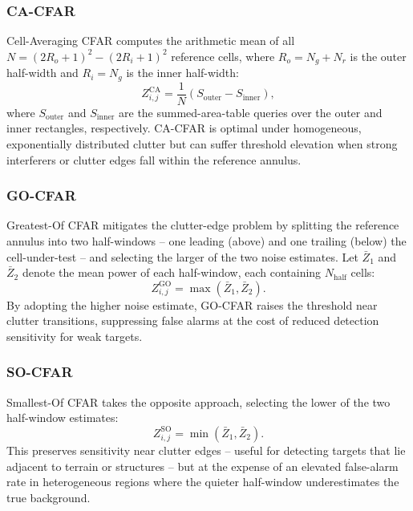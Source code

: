 \documentclass[conf]{new-aiaa}
\begin{document}
\subsubsection{CA-CFAR}
Cell-Averaging CFAR computes the arithmetic mean of all $N = (2R_o+1)^2 - (2R_i+1)^2$ reference cells, where $R_o = N_g + N_r$ is the outer half-width and $R_i = N_g$ is the inner half-width:
\begin{equation}
    Z_{i,j}^{\mathrm{CA}} = \frac{1}{N}\left(S_{\mathrm{outer}} - S_{\mathrm{inner}}\right), \label{eq:ca}
\end{equation}
where $S_{\mathrm{outer}}$ and $S_{\mathrm{inner}}$ are the summed-area-table queries over the outer and inner rectangles, respectively. CA-CFAR is optimal under homogeneous, exponentially distributed clutter but can suffer threshold elevation when strong interferers or clutter edges fall within the reference annulus.

\subsubsection{GO-CFAR}
Greatest-Of CFAR mitigates the clutter-edge problem by splitting the reference annulus into two half-windows -- one leading (above) and one trailing (below) the cell-under-test -- and selecting the larger of the two noise estimates. Let $\bar{Z}_1$ and $\bar{Z}_2$ denote the mean power of each half-window, each containing $N_{\mathrm{half}}$ cells:
\begin{equation}
    Z_{i,j}^{\mathrm{GO}} = \max(\bar{Z}_1, \bar{Z}_2). \label{eq:go}
\end{equation}
By adopting the higher noise estimate, GO-CFAR raises the threshold near clutter transitions, suppressing false alarms at the cost of reduced detection sensitivity for weak targets.

\subsubsection{SO-CFAR}
Smallest-Of CFAR takes the opposite approach, selecting the lower of the two half-window estimates:
\begin{equation}
    Z_{i,j}^{\mathrm{SO}} = \min(\bar{Z}_1, \bar{Z}_2). \label{eq:so}
\end{equation}
This preserves sensitivity near clutter edges -- useful for detecting targets that lie adjacent to terrain or structures -- but at the expense of an elevated false-alarm rate in heterogeneous regions where the quieter half-window underestimates the true background.
\end{document}
